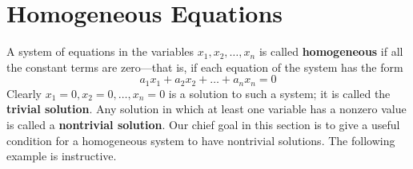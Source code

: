 \section{Homogeneous Equations}
\label{sec:1_3}

A system of equations in the variables $x_1, x_2, \dots, x_n$ is called \textbf{homogeneous}  if all the constant terms are zero---that is, if each equation of the system has the form
\begin{equation*}
a_1x_1 + a_2x_2 + \dots + a_nx_n = 0
\end{equation*}
Clearly $x_1 = 0, x_2 = 0, \dots, x_n = 0$ is a solution to such a system; it is called the \textbf{trivial solution}. Any solution in which at least one variable has a nonzero value is called a \textbf{nontrivial solution}.
 Our chief goal in this section is to give a useful condition for a homogeneous system to have nontrivial solutions. The following example is instructive.

